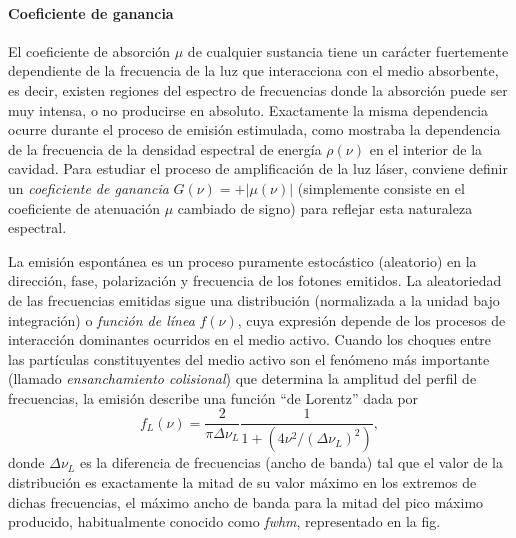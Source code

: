 \paragraph{Coeficiente de ganancia}
El coeficiente de absorción $\mu$ de cualquier sustancia tiene un carácter fuertemente dependiente de la frecuencia de la luz que interacciona con el medio absorbente, es decir, existen regiones del espectro de frecuencias donde la absorción puede ser muy intensa, o no producirse en absoluto. Exactamente la misma dependencia ocurre durante el proceso de emisión estimulada, como mostraba la dependencia de la frecuencia de la densidad espectral de energía $\rho(\nu)$ en el interior de la cavidad. Para estudiar el proceso de amplificación de la luz láser, conviene definir un \emph{coeficiente de ganancia} $G(\nu) = +|\mu(\nu)|$ (simplemente consiste en el coeficiente de atenuación $\mu$ cambiado de signo) para reflejar esta naturaleza espectral.

La emisión espontánea es un proceso puramente estocástico (aleatorio) en la dirección, fase, polarización y frecuencia de los fotones emitidos. La aleatoriedad de las frecuencias emitidas sigue una distribución (normalizada a la unidad bajo integración) o \emph{función de línea} $f(\nu)$, cuya expresión depende de los procesos de interacción dominantes ocurridos en el medio activo. Cuando los choques entre las partículas constituyentes del medio activo son el fenómeno más importante (llamado \emph{ensanchamiento colisional}) que determina la amplitud del perfil de frecuencias, la emisión describe una función \enquote{de Lorentz} dada por \autocite{Milonni1988,Tallents2003,Svelto2010}
\begin{equation}\label{eq:2.10}
  f_{L}(\nu) = \frac{2}{\pi \Delta \nu_{L}}\frac{1}{1 + \left(4 \nu^{2}/(\Delta \nu_{L})^{2}\right)},
\end{equation}
donde $\Delta \nu_{L}$ es la diferencia de frecuencias (ancho de banda) tal que el valor de la distribución es exactamente la mitad de su valor máximo en los extremos de dichas frecuencias, el máximo ancho de banda para la mitad del pico máximo producido, habitualmente conocido como \emph{\acrfull{fwhm}}, representado en la fig. 

